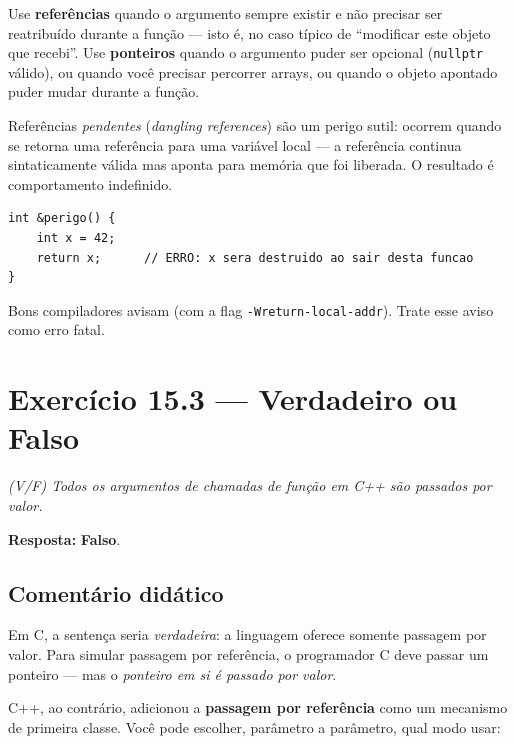 \documentclass[11pt,a4paper]{article}
\begin{document}
\begin{boaprat}
Use \textbf{refer\^encias} quando o argumento sempre existir e n\~ao precisar ser reatribu\'ido durante a fun\c{c}\~ao --- isto \'e, no caso t\'ipico de ``modificar este objeto que recebi''. Use \textbf{ponteiros} quando o argumento puder ser opcional (\texttt{nullptr} v\'alido), ou quando voc\^e precisar percorrer arrays, ou quando o objeto apontado puder mudar durante a fun\c{c}\~ao.
\end{boaprat}

\begin{errocomum}
Refer\^encias \emph{pendentes} (\emph{dangling references}) s\~ao um perigo sutil: ocorrem quando se retorna uma refer\^encia para uma vari\'avel local --- a refer\^encia continua sintaticamente v\'alida mas aponta para mem\'oria que foi liberada. O resultado \'e comportamento indefinido.
\begin{lstlisting}[style=cppcode,numbers=none]
int &perigo() {
    int x = 42;
    return x;      // ERRO: x sera destruido ao sair desta funcao
}
\end{lstlisting}
Bons compiladores avisam (com a flag \texttt{-Wreturn-local-addr}). Trate esse aviso como erro fatal.
\end{errocomum}

\section{Exerc\'icio 15.3 --- Verdadeiro ou Falso}

\textit{(V/F) Todos os argumentos de chamadas de fun\c{c}\~ao em C++ s\~ao passados por valor.}

\begin{resposta}\textbf{Resposta:} \textbf{Falso}.\end{resposta}

\subsection*{Coment\'ario did\'atico}

Em C, a senten\c{c}a seria \emph{verdadeira}: a linguagem oferece somente passagem por valor. Para simular passagem por refer\^encia, o programador C deve passar um ponteiro --- mas o \emph{ponteiro em si \'e passado por valor}.

C++, ao contr\'ario, adicionou a \textbf{passagem por refer\^encia} como um mecanismo de primeira classe. Voc\^e pode escolher, par\^ametro a par\^ametro, qual modo usar:
\end{document}
